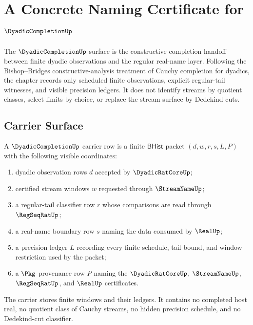 \chapter{A Concrete Naming Certificate for $\DyadicCompletionUp$}
\label{ch:concrete-instances-dyadiccompletion}

The $\DyadicCompletionUp$ surface is the constructive completion handoff between
finite dyadic observations and the regular real-name layer. Following the
Bishop--Bridges constructive-analysis treatment of Cauchy completion for
dyadics, the chapter records only scheduled finite observations, explicit
regular-tail witnesses, and visible precision ledgers. It does not identify
streams by quotient classes, select limits by choice, or replace the stream
surface by Dedekind cuts.

\section{Carrier Surface}
\label{sec:dyadiccompletion-carrier-surface}

\begin{definition}
\label{def:dyadiccompletion-carrier}
A $\DyadicCompletionUp$ carrier row is a finite $\mathsf{BHist}$ packet
$(d,w,r,s,L,P)$ with the following visible coordinates:
\begin{enumerate}
\item dyadic observation rows $d$ accepted by $\DyadicRatCoreUp$;
\item certified stream windows $w$ requested through $\StreamNameUp$;
\item a regular-tail classifier row $r$ whose comparisons are read through
$\RegSeqRatUp$;
\item a real-name boundary row $s$ naming the data consumed by $\RealUp$;
\item a precision ledger $L$ recording every finite schedule, tail bound, and
window restriction used by the packet;
\item a $\Pkg$ provenance row $P$ naming the $\DyadicRatCoreUp$,
$\StreamNameUp$, $\RegSeqRatUp$, and $\RealUp$ certificates.
\end{enumerate}
The carrier stores finite windows and their ledgers. It contains no completed
host real, no quotient class of Cauchy streams, no hidden precision schedule,
and no Dedekind-cut classifier.
\end{definition}


